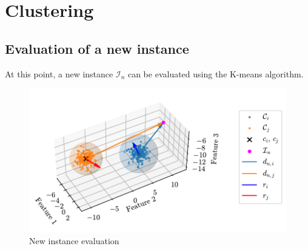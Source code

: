 \chapter{Clustering}

\section{Evaluation of a new instance}

At this point, a new instance $\mathcal{I}_n$ can be evaluated using the K-means algorithm. 

\begin{figure}[htbp]
  \centering
  \includegraphics[width=\textwidth]{images/Spheres_2.pdf}
\caption{New instance evaluation}
\label{fig:clust_spheres}
\end{figure}